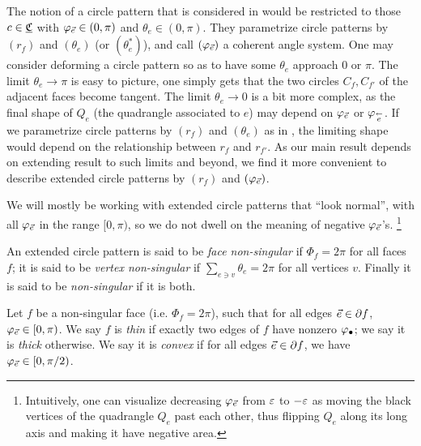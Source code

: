 The notion of a circle pattern that is considered in \cite{BandS}
would be restricted to those $c\in {\underline{\mathfrak{C}}}$
with $\varphi_{\vec{e}} \in (0,\pi)$ and $\theta_e \in (0,\pi)$.
They parametrize circle patterns by $(r_f)$ and $(\theta_e)$
(or $(\theta_e^*)$),
and call $(\varphi_{\vec{e}})$ a coherent angle system.
One may consider deforming a circle pattern so as to have
some $\theta_e$ approach 0 or $\pi$.
The limit $\theta_e \to \pi$ is easy to picture, one simply gets that the two circles
$C_f, C_{f'}$ of the adjacent faces become tangent. The limit $\theta_e \to 0$
is a bit more complex, as the final shape of $Q_e$ (the quadrangle associated to $e$)
may depend on $\varphi_{\vec{e}}$ or $\varphi_{\overset{\leftarrow}{e}}$.
If we parametrize circle patterns by $(r_f)$ and $(\theta_e)$ as in \cite{BandS},
the limiting shape would depend on the relationship between 
$r_f$ and $r_{f'}$.
As our main result depends on extending \cite{BandS} result
to such limits and beyond,
we find it more convenient to describe extended circle patterns by
$(r_f)$ and $(\varphi_{\vec{e}})$.


We will mostly be working with extended circle patterns that ``look normal'',
with all $\varphi_{\vec{e}}$ in the range $[0,\pi)$,
so we do not dwell on the meaning of negative $\varphi_{\vec{e}}$'s.
\footnote{
Intuitively, one can visualize decreasing $\varphi_{\vec{e}}$
from $\varepsilon$ to $-\varepsilon$
as moving the black vertices of the quadrangle $Q_e$ past each other,
thus flipping $Q_e$ along its long axis
and making it have negative area.
}

\begin{define}
An extended circle pattern is said to be \emph{face non-singular}
if $\Phi_f = 2\pi$ for all faces $f$; it is said to be \emph{vertex non-singular}
if $\sum_{e \ni v} \theta_e = 2\pi$ for all vertices $v$.
Finally it is said to be \emph{non-singular} if it is both.
\end{define}


\begin{define}
Let $f$ be a non-singular face (i.e. $\Phi_f = 2\pi$),
such that for all edges $\vec{e} \in \partial f$,
$\varphi_{\vec{e}} \in [0,\pi)$.
We say $f$ is \emph{thin} if
exactly two edges of $f$ have nonzero $\varphi_\bullet$;
we say it is \emph{thick} otherwise.
We say it is \emph{convex} if for all edges $\vec{e} \in \partial f$,
we have $\varphi_{\vec{e}} \in [0,\pi/2)$.
\end{define}



